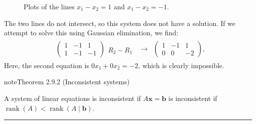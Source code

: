 \documentclass[letterpaper,10pt,english]{jupyterBook}
\begin{document}
\begin{figure}[htbp]
\centering
\capstart

\noindent{}
\caption{Plots of the lines \(x_1 - x_2 = 1\) and \(x_1 - x_2 = -1\).}\label{\detokenize{_pages/2.6_Consistent_systems:inconsistent-system-plot}}\end{figure}

\sphinxAtStartPar
The two lines do not intersect, so this system does not have a solution. If we attempt to solve this using Gaussian elimination, we find:
\begin{equation*}
\begin{split} \begin{align*}
    & \left( \begin{array}{cc|c}
        1 & -1 & 1 \\
        1 & -1 & -1
    \end{array} \right)
    \begin{array}{l} \\ R_2 - R_1 \end{array} &
    \longrightarrow &
    \left( \begin{array}{cc|c}
        1 & -1 & 1 \\
        0 & 0 & -2
    \end{array} \right),
\end{align*} \end{split}
\end{equation*}
\sphinxAtStartPar
Here, the second equation is \(0x_1 + 0x_2 = -2\), which is clearly impossible.
\label{_pages/2.6_Consistent_systems:inconsistent-system-theorem}
\begin{sphinxadmonition}{note}{Theorem 2.9.2 (Inconsistent systems)}



\sphinxAtStartPar
A system of linear equations is inconsistent if \(A\mathbf{x} = \mathbf{b}\) is inconsistent if \(\operatorname{rank}(A) < \operatorname{rank}(A \mid \mathbf{b})\).
\end{sphinxadmonition}


\bigskip\hrule\bigskip


\ignorespaces 
\end{document}
